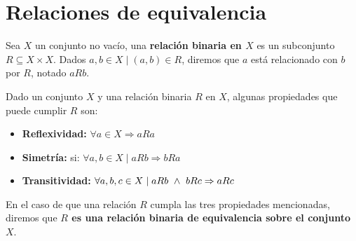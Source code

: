 \section{Relaciones de equivalencia}
\begin{definicion}
    Sea $X$ un conjunto no vacío, una \textbf{relación binaria en $X$} es un subconjunto $R \subseteq X \times X$. Dados $a, b \in X \mid (a, b) \in R$, diremos que $a$ está relacionado con $b$ por $R$, notado
    $aRb$.
\end{definicion}

Dado un conjunto $X$ y una relación binaria $R$ en $X$, algunas propiedades que puede cumplir $R$ son:
\begin{itemize}
    \item \textbf{Reflexividad:}  $\forall a \in X \Rightarrow aRa$
    \item \textbf{Simetría:} si: $\forall a,b \in X \mid aRb \Rightarrow bRa$
    \item \textbf{Transitividad:} $\forall a,b,c \in X \mid aRb \ \land \  bRc \Rightarrow aRc$
\end{itemize}
En el caso de que una relación $R$ cumpla las tres propiedades mencionadas, diremos que \textbf{$R$ es una relación binaria de equivalencia sobre el conjunto $X$}.

